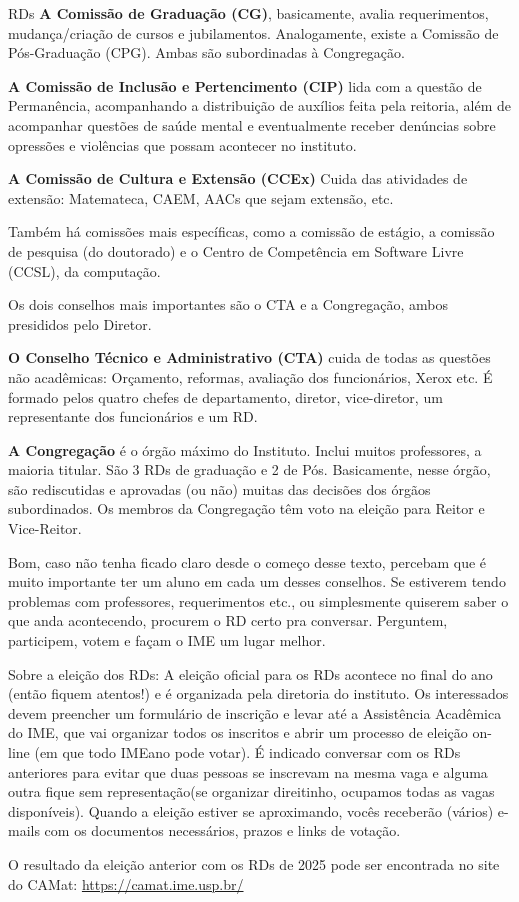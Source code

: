 \begin{subsecao}{RDs}
{\bf A Comissão de Graduação (CG)}, basicamente, avalia requerimentos,
mudança/criação de cursos e jubilamentos. Analogamente, existe a Comissão de
Pós-Graduação (CPG). Ambas são subordinadas à Congregação.

{\bf A Comissão de Inclusão e Pertencimento (CIP)} lida com a questão de Permanência,
acompanhando a distribuição de auxílios feita pela reitoria, além de acompanhar
questões de saúde mental e eventualmente receber denúncias sobre opressões e 
violências que possam acontecer no instituto.

{\bf A Comissão de Cultura e Extensão (CCEx)} Cuida das atividades de extensão: 
Matemateca, CAEM, AACs que sejam extensão, etc.

Também há comissões mais específicas, como a comissão de estágio, a comissão de
pesquisa (do doutorado) e o Centro de Competência em Software Livre (CCSL), da
computação.

Os dois conselhos mais importantes são o CTA e a Congregação, ambos presididos
pelo Diretor.

{\bf O Conselho Técnico e Administrativo (CTA)} cuida de todas as questões não
acadêmicas: Orçamento, reformas, avaliação dos funcionários, Xerox etc. É
formado pelos quatro chefes de departamento, diretor, vice-diretor, um
representante dos funcionários e um RD.

{\bf A Congregação} é o órgão máximo do Instituto. Inclui muitos professores, a
maioria titular. São 3 RDs de graduação e 2 de Pós. Basicamente,
nesse órgão, são rediscutidas e aprovadas (ou não) muitas das decisões
dos órgãos subordinados. Os membros da Congregação têm voto na eleição para
Reitor e Vice-Reitor.

Bom, caso não tenha ficado claro desde o começo desse texto, percebam que é
muito importante ter um aluno em cada um desses conselhos. Se estiverem tendo
problemas com professores, requerimentos etc., ou simplesmente quiserem saber
o que anda acontecendo, procurem o RD certo pra conversar. Perguntem,
participem, votem e façam o IME um lugar melhor.

Sobre a eleição dos RDs: A eleição oficial para os RDs acontece no final do ano
(então fiquem atentos!) e é organizada pela diretoria do instituto. Os
interessados devem preencher um formulário de inscrição e levar até a
Assistência Acadêmica do IME, que vai organizar todos os inscritos e abrir um
processo de eleição on-line (em que todo IMEano pode votar). É indicado conversar
com os RDs anteriores para evitar que duas pessoas se inscrevam na mesma vaga e
alguma outra fique sem representação(se organizar direitinho, ocupamos todas as vagas
disponíveis). Quando a eleição
estiver se aproximando, vocês receberão (vários) e-mails com os documentos
necessários, prazos e links de votação.

O resultado da eleição anterior com os RDs de 2025 pode ser encontrada no site
do CAMat:
\url{https://camat.ime.usp.br/}


\end{subsecao}
